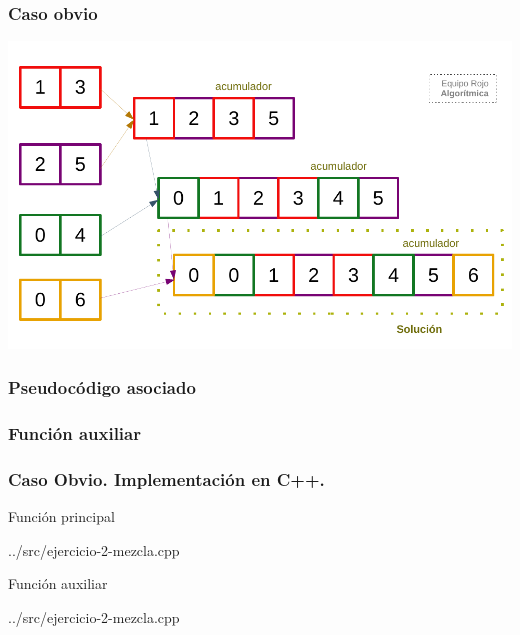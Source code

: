 \documentclass[13pt]{beamer}
\begin{document}
    \begin{frame}
        \frametitle{Caso obvio}

        \includegraphics[scale=0.66]{img/orden_2a.pdf}
    \end{frame}

    \begin{frame}
        \frametitle{Pseudocódigo asociado}

                

    \end{frame}

    \begin{frame}
        \frametitle{Función auxiliar}

                

    \end{frame}

	\begin{frame}
		\frametitle{Caso Obvio. Implementación en C++.}

        \begin{exampleblock}{Función principal}
            
            {../src/ejercicio-2-mezcla.cpp} 
        \end{exampleblock}
	\end{frame}

    \begin{frame}

        \begin{exampleblock}{Función auxiliar}
            
            {../src/ejercicio-2-mezcla.cpp} 
        \end{exampleblock}
	\end{frame}
\end{document}
